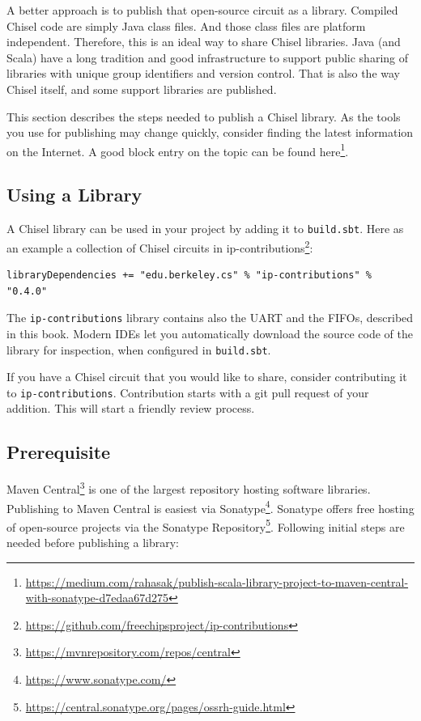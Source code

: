 \documentclass[%
    10pt,
    headinclude, footexclude,
    openright, %
    notitlepage,
    cleardoubleempty,
    headsepline,
    pointlessnumbers,
    bibtotoc, idxtotoc,
    ]{scrbook}
\newcommand{\code}[1]{{\small{\texttt{#1}}}}
\newcommand{\myref}[2]{\href{#1}{#2}}
\renewcommand{\myref}[2]{{#2}{\footnote{\url{#1}}}}
\begin{document}
A better approach is to publish that open-source circuit as a library.
Compiled Chisel code are simply Java class files. And those class files are
platform independent. Therefore, this is an ideal way to share Chisel libraries.
Java (and Scala) have a long tradition and good infrastructure to support
public sharing of libraries with unique group identifiers and version control.
That is also the way Chisel itself, and some support libraries are published.

This section describes the steps needed to publish a Chisel library. As the tools you
use for publishing may change quickly, consider finding the latest information on the
Internet. A good block entry on the topic can be found
\myref{https://medium.com/rahasak/publish-scala-library-project-to-maven-central-with-sonatype-d7edaa67d275}{here}.

\subsection{Using a Library}

A Chisel library can be used in your project by adding it to \code{build.sbt}. Here as an
example a collection of Chisel circuits in \myref{https://github.com/freechipsproject/ip-contributions}{ip-contributions}:

\begin{verbatim}
libraryDependencies += "edu.berkeley.cs" % "ip-contributions" % "0.4.0"
\end{verbatim}

\noindent The \code{ip-contributions} library contains also the UART and the FIFOs, described in this book.
Modern IDEs let you automatically download the source code of the library for inspection, when configured
in \code{build.sbt}.

If you have a Chisel circuit that you would like to share, consider contributing it to \code{ip-contributions}.
Contribution starts with a git pull request of your addition. This will start a friendly review process.

\subsection{Prerequisite}

\myref{https://mvnrepository.com/repos/central}{Maven Central} is one of the largest repository
hosting software libraries. Publishing to Maven Central is easiest via
\myref{https://www.sonatype.com/}{Sonatype}. Sonatype offers free hosting of open-source
projects via the \myref{https://central.sonatype.org/pages/ossrh-guide.html}{Sonatype Repository}.
Following initial steps are needed before publishing a library:
\end{document}
